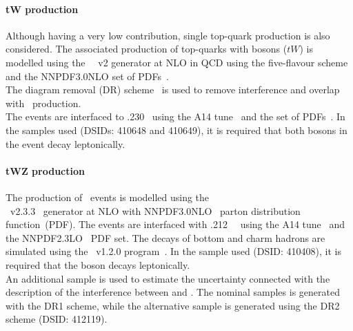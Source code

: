 \paragraph{tW production} 
Although having a very low contribution, single top-quark production is also considered.
The associated production of top-quarks with \PW bosons ($tW$) is
modelled using the
\powhegbox~\cite{Re:2010bp,Nason:2004rx,Frixione:2007vw,Alioli:2010xd}~v2
generator at NLO in QCD using the five-flavour scheme and the
NNPDF3.0NLO set of PDFs~\cite{Ball:2014uwa}.\\
The diagram removal (DR) scheme~\cite{Frixione:2008yi} is used to
remove interference and overlap with \ttbar\ production.\\ 
The events are interfaced to \pythia.230~\cite{Sjostrand:2014zea} using the A14
tune~\cite{ATL-PHYS-PUB-2014-021} and the \nnpdftwo set of
PDFs~\cite{Ball:2012cx}.
In the samples used (DSIDs: 410648 and 410649), it is required that both \PW bosons in the event decay leptonically. 

\paragraph{tWZ production} 
The production of \tWZ\ events is modelled using the \\ \mgamc~v2.3.3~\cite{Alwall:2014hca}
generator at NLO with NNPDF3.0NLO~\cite{Ball:2014uwa} parton distribution function~(PDF).
The events are interfaced with \pythia.212~\cite{Sjostrand:2014zea}~ using the A14 tune~\cite{ATL-PHYS-PUB-2014-021} and the NNPDF2.3LO~\cite{Ball:2014uwa} PDF set.
The decays of bottom and charm hadrons are simulated using the \evtgen\ v1.2.0 program~\cite{EvtGen}. 
In the sample used (DSID\@: 410408), it is required that the \PZ boson decays leptonically. \\
An additional \tWZ sample is used to estimate the uncertainty connected with the description of the interference between \ttZ and \tWZ. The nominal samples is generated with the DR1 scheme, while the alternative sample is generated using the DR2 scheme (DSID\@: 412119).

